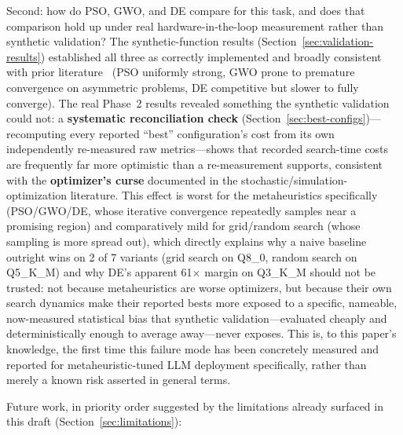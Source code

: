 \documentclass[journal]{IEEEtran}
\begin{document}
Second: how do PSO, GWO, and DE compare for this task, and does that comparison hold up under real hardware-in-the-loop measurement rather than synthetic validation? The synthetic-function results (Section~\ref{sec:validation-results}) established all three as correctly implemented and broadly consistent with prior literature~\cite{ref11} (PSO uniformly strong, GWO prone to premature convergence on asymmetric problems, DE competitive but slower to fully converge). The real Phase~2 results revealed something the synthetic validation could not: a \textbf{systematic reconciliation check} (Section~\ref{sec:best-configs})---recomputing every reported ``best'' configuration's cost from its own independently re-measured raw metrics---shows that recorded search-time costs are frequently far more optimistic than a re-measurement supports, consistent with the \textbf{optimizer's curse} documented in the stochastic/simulation-optimization literature. This effect is worst for the metaheuristics specifically (PSO/GWO/DE, whose iterative convergence repeatedly samples near a promising region) and comparatively mild for grid/random search (whose sampling is more spread out), which directly explains why a naive baseline outright wins on 2 of 7 variants (grid search on Q8\_0, random search on Q5\_K\_M) and why DE's apparent 61$\times$ margin on Q3\_K\_M should not be trusted: not because metaheuristics are worse optimizers, but because their own search dynamics make their reported bests more exposed to a specific, nameable, now-measured statistical bias that synthetic validation---evaluated cheaply and deterministically enough to average away---never exposes. This is, to this paper's knowledge, the first time this failure mode has been concretely measured and reported for metaheuristic-tuned LLM deployment specifically, rather than merely a known risk asserted in general terms.

Future work, in priority order suggested by the limitations already surfaced in this draft (Section~\ref{sec:limitations}):
\end{document}
